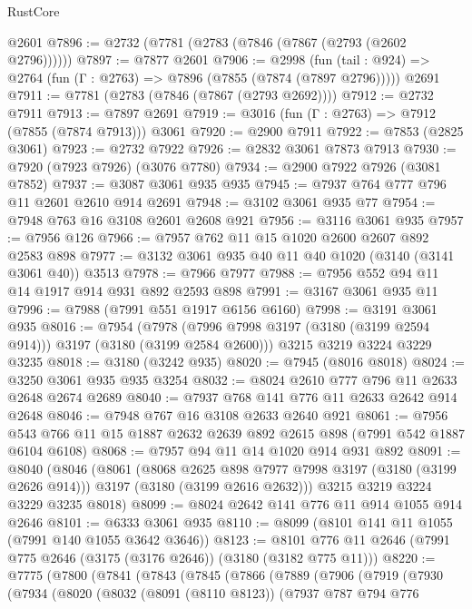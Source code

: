 \begin{lexlean}{RustCore}
\begin{coremodule}
    @2601
@7896 := @2732 (@7781 (@2783 (@7846 (@7867 (@2793 (@2602 @2796))))))
@7897 := @7877 @2601
@7906 := @2998
    (fun (tail : @924) => @2764 (fun (Γ : @2763) => @7896 (@7855 (@7874 (@7897 @2796)))))
    @2691
@7911 := @7781 (@2783 (@7846 (@7867 (@2793 @2692))))
@7912 := @2732 @7911
@7913 := @7897 @2691
@7919 := @3016 (fun (Γ : @2763) => @7912 (@7855 (@7874 @7913))) @3061
@7920 := @2900 @7911
@7922 := @7853 (@2825 @3061)
@7923 := @2732 @7922
@7926 := @2832 @3061 @7873 @7913
@7930 := @7920 (@7923 @7926) (@3076 @7780)
@7934 := @2900 @7922 @7926 (@3081 @7852)
@7937 := @3087 @3061 @935 @935
@7945 := @7937 @764 @777 @796 @11 @2601 @2610 @914 @2691
@7948 := @3102 @3061 @935 @77
@7954 := @7948 @763 @16 @3108 @2601 @2608 @921
@7956 := @3116 @3061 @935
@7957 := @7956 @126
@7966 := @7957 @762 @11 @15 @1020 @2600 @2607 @892 @2583 @898
@7977 := @3132 @3061 @935 @40 @11 @40 @1020 (@3140 (@3141 @3061 @40)) @3513
@7978 := @7966 @7977
@7988 := @7956 @552 @94 @11 @14 @1917 @914 @931 @892 @2593 @898
@7991 := @3167 @3061 @935 @11
@7996 := @7988 (@7991 @551 @1917 @6156 @6160)
@7998 := @3191 @3061 @935
@8016 := @7954
    (@7978 (@7996 @7998 @3197 (@3180 (@3199 @2594 @914))) @3197 (@3180 (@3199 @2584 @2600)))
    @3215
    @3219
    @3224
    @3229
    @3235
@8018 := @3180 (@3242 @935)
@8020 := @7945 (@8016 @8018)
@8024 := @3250 @3061 @935 @935 @3254
@8032 := @8024 @2610 @777 @796 @11 @2633 @2648 @2674 @2689
@8040 := @7937 @768 @141 @776 @11 @2633 @2642 @914 @2648
@8046 := @7948 @767 @16 @3108 @2633 @2640 @921
@8061 := @7956 @543 @766 @11 @15 @1887 @2632 @2639 @892 @2615 @898 (@7991 @542 @1887 @6104 @6108)
@8068 := @7957 @94 @11 @14 @1020 @914 @931 @892
@8091 := @8040
    (@8046
      (@8061
        (@8068 @2625 @898 @7977 @7998 @3197 (@3180 (@3199 @2626 @914)))
        @3197
        (@3180 (@3199 @2616 @2632)))
      @3215
      @3219
      @3224
      @3229
      @3235
      @8018)
@8099 := @8024 @2642 @141 @776 @11 @914 @1055 @914 @2646
@8101 := @6333 @3061 @935
@8110 := @8099 (@8101 @141 @11 @1055 (@7991 @140 @1055 @3642 @3646))
@8123 := @8101 @776 @11 @2646 (@7991 @775 @2646 (@3175 (@3176 @2646)) (@3180 (@3182 @775 @11)))
@8220 := @7775
    (@7800
      (@7841
        (@7843
          (@7845
            (@7866
              (@7889
                (@7906
                  (@7919
                    (@7930
                      (@7934
                        (@8020
                          (@8032
                            (@8091 (@8110 @8123))
                            (@7937
                              @787
                              @794
                              @776

\end{coremodule}
\end{lexlean}
